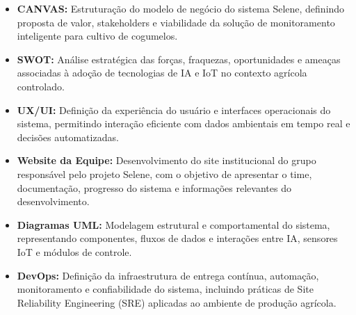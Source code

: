 \documentclass[11pt,a4paper]{article}
\begin{document}
\begin{itemize}
    \item \textbf{CANVAS:} Estruturação do modelo de negócio do sistema Selene, definindo proposta de valor, stakeholders e viabilidade da solução de monitoramento inteligente para cultivo de cogumelos.
    
    \item \textbf{SWOT:} Análise estratégica das forças, fraquezas, oportunidades e ameaças associadas à adoção de tecnologias de IA e IoT no contexto agrícola controlado.
    
    \item \textbf{UX/UI:} Definição da experiência do usuário e interfaces operacionais do sistema, permitindo interação eficiente com dados ambientais em tempo real e decisões automatizadas.
    
    \item \textbf{Website da Equipe:} Desenvolvimento do site institucional do grupo responsável pelo projeto Selene, com o objetivo de apresentar o time, documentação, progresso do sistema e informações relevantes do desenvolvimento.
    
    \item \textbf{Diagramas UML:} Modelagem estrutural e comportamental do sistema, representando componentes, fluxos de dados e interações entre IA, sensores IoT e módulos de controle.
    
    \item \textbf{DevOps:} Definição da infraestrutura de entrega contínua, automação, monitoramento e confiabilidade do sistema, incluindo práticas de Site Reliability Engineering (SRE) aplicadas ao ambiente de produção agrícola.
\end{itemize}
\end{document}
